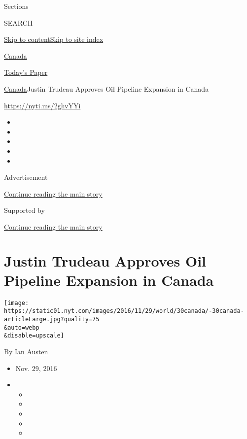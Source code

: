 Sections

SEARCH

\protect\hyperlink{site-content}{Skip to
content}\protect\hyperlink{site-index}{Skip to site index}

\href{https://www.nytimes.com/section/world/canada}{Canada}

\href{https://myaccount.nytimes.com/auth/login?response_type=cookie\&client_id=vi}{}

\href{https://www.nytimes.com/section/todayspaper}{Today's Paper}

\href{/section/world/canada}{Canada}\textbar{}Justin Trudeau Approves
Oil Pipeline Expansion in Canada

\url{https://nyti.ms/2ghvYYi}

\begin{itemize}
\item
\item
\item
\item
\item
\end{itemize}

Advertisement

\protect\hyperlink{after-top}{Continue reading the main story}

Supported by

\protect\hyperlink{after-sponsor}{Continue reading the main story}

\hypertarget{justin-trudeau-approves-oil-pipeline-expansion-in-canada}{%
\section{Justin Trudeau Approves Oil Pipeline Expansion in
Canada}\label{justin-trudeau-approves-oil-pipeline-expansion-in-canada}}

\texttt{[image: https://static01.nyt.com/images/2016/11/29/world/30canada/-30canada-articleLarge.jpg?quality=75\\\&auto=webp\\\&disable=upscale]}

By \href{http://www.nytimes.com/by/ian-austen}{Ian Austen}

\begin{itemize}
\item
  Nov. 29, 2016
\item
  \begin{itemize}
  \item
  \item
  \item
  \item
  \item
  \end{itemize}
\end{itemize}

